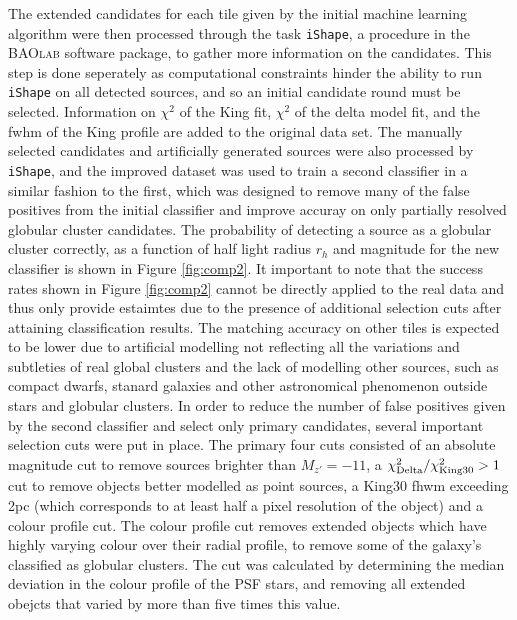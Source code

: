 \documentclass[useAMS,usenatbib]{mn2e}
\begin{document}
The extended candidates for each tile given by the initial machine learning algorithm were then processed through the task \verb|iShape|, a procedure in the \textsc{BAOlab} software package, to gather more information on the candidates. This step is done seperately as computational constraints hinder the ability to run \verb|iShape| on all detected sources, and so an initial candidate round must be selected. Information on $\chi^2$ of the King fit, $\chi^2$ of the delta model fit, and the fwhm of the King profile are added to the original data set. The manually selected candidates and artificially generated sources were also processed by \verb|iShape|, and the improved dataset was used to train a second classifier in a similar fashion to the first, which was designed to remove many of the false positives from the initial classifier and improve accuray on only partially resolved globular cluster candidates. The probability of detecting a source as a globular cluster correctly, as a function of half light radius $r_h$ and magnitude for the new classifier is shown in Figure \ref{fig:comp2}. It important to note that the success rates shown in Figure \ref{fig:comp2} cannot be directly applied to the real data and thus only provide estaimtes due to the presence of additional selection cuts after attaining classification results. The matching accuracy on other tiles is expected to be lower due to artificial modelling not reflecting all the variations and subtleties of real global clusters and the lack of modelling other sources, such as compact dwarfs, stanard galaxies and other astronomical phenomenon outside stars and globular clusters. In order to reduce the number of false positives given by the second classifier and select only primary candidates, several important selection cuts were put in place. The primary four cuts consisted of an absolute magnitude cut to remove sources brighter than $M_{z'} = -11$, a $\chi^2_{\rm{Delta}}/\chi^2_{\rm{King30}} >1$ cut to remove objects better modelled as point sources, a King30 fhwm exceeding 2pc (which corresponds to at least half a pixel resolution of the object) and a colour profile cut. The colour profile cut removes extended objects which have highly varying colour over their radial profile, to remove some of the galaxy's classified as globular clusters. The cut was calculated by determining the median deviation in the colour profile of the PSF stars, and removing all extended obejcts that varied by more than five times this value.
\end{document}
